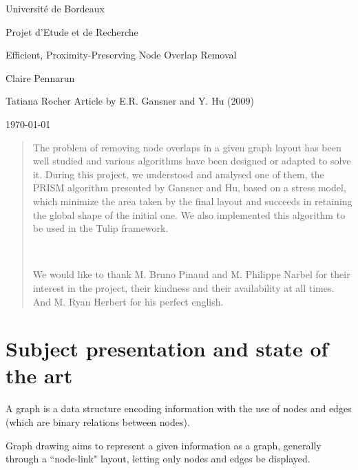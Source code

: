 \documentclass[12pt]{report}
\begin{document}
\begin{titlepage}
\begin{center}

\hfill

\bigskip
\huge{Université de Bordeaux \par \Large Projet d'Etude et de Recherche} 
\vfill
\bigskip 
\Huge 
\bigskip Efficient, Proximity-Preserving Node Overlap Removal \par 
\vfill
\Large Claire Pennarun \par 
		Tatiana Rocher
\vfill
\Large Article by E.R. Gansner and Y. Hu (2009)	
		\bigskip 
\bigskip

\Large
\today
\end{center}
\end{titlepage}

\tableofcontents
\newpage


\begin{abstract}
The problem of removing node overlaps in a given graph layout has been well studied and various algorithms have been designed or adapted to solve it. During this project, we understood and analysed one of them, the PRISM algorithm presented by Gansner and Hu, based on a stress model, which minimize the area taken by the final layout and succeeds in retaining the global shape of the initial one. We also implemented this algorithm to be used in the Tulip framework.

\bigskip
~\
\bigskip
~\
\bigskip
\begin{flushright}
\small
We would like to thank M. Bruno Pinaud and M. Philippe Narbel for their interest in the project, their kindness and their availability at all times. And M. Ryan Herbert for his perfect english.
\end{flushright}
\end{abstract}



\chapter{Subject presentation and state of the art}

A graph is a data structure encoding information with the use of nodes and edges (which are binary relations between nodes).

Graph drawing aims to represent a given information as a graph, generally through a ``node-link" layout, letting only nodes and edges be displayed. 
\end{document}
